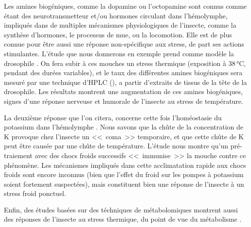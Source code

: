 		Les amines biogéniques, comme la dopamine ou l'octopamine sont connus comme étant des neurotransmetteur et/ou hormones circulant dans l'hémolymphe, impliqués dans de multiples mécanismes physiologiques de l'insecte, comme la synthèse d'hormones, le processus de mue, ou la locomotion.
		Elle est de plus connue pour être aussi une réponse non-spécifique aux stress, de part ses actions stimulantes.
		L'étude que nous donnerons en exemple prend comme modèle la drosophile  \cite{hirashima2000}.
		On fera subir à ces mouches un stress thermique (exposition à 38\,°C, pendant des durées variables), et le taux des différentes amines biogéniques sera mesuré par une technique d'HPLC (), a partir d'extraits de tissus de la tête de la drosophile.
		Les résultats montrent une augmentation de ces amines biogéniques, signes d'une réponse nerveuse et humorale de l'insecte au stress de température.

		La deuxième réponse que l'on citera, concerne cette fois l'homéostasie du potassium dans l'hémolymphe \cite{armstrong2012}.
		Nous savons que la chûte de la concentration de K\up{+} provoque chez l'insecte un <<~coma~>> temporaire, et que cette chûte de K\up{+} peut être causée par une chûte de température.
		L'étude nous montre qu'un pré-traiement avec des chocs froids successifs <<~immunise~>> la mouche contre ce phénomène.
		Les mécanismes impliqués dans cette acclimatation rapide aux chocs froids sont encore inconnus (bien que l'effet du froid sur les pompes à potassium soient fortement suspectées), mais constituent bien une réponse de l'insecte à un stress froid ponctuel.

		Enfin, des études basées sur des téchniques de métabolomiques montrent aussi des réponses de l'insecte au stress thermique, du point de vue du métabolisme \cite{malmendal2006}.

